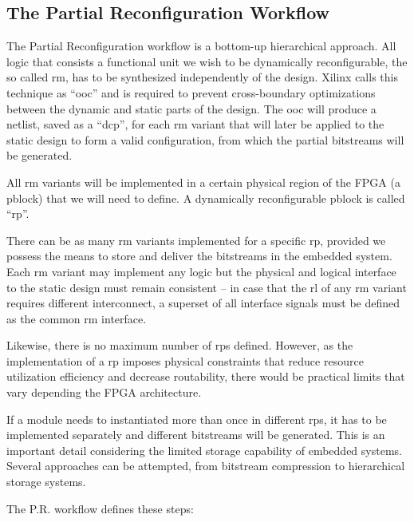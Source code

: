 \subsection{The Partial Reconfiguration Workflow}
\label{sec:pr-workflow}

The Partial Reconfiguration workflow is a bottom-up hierarchical approach.
All logic that consists a functional unit we wish to be dynamically reconfigurable,
the so called \gls{rm}, has to be synthesized independently of the design.
Xilinx calls this technique as ``\gls{ooc}'' and is required to prevent
cross-boundary optimizations between the dynamic and static parts of the design.
The \gls{ooc} will produce a netlist, saved as a ``\gls{dcp}'', for each \gls{rm} variant
that will later be applied to the static design to form a valid configuration, 
from which the partial bitstreams will be generated.

All \gls{rm} variants will be implemented in a certain physical region of the FPGA
(a \gls{pblock}) that we will need to define. A dynamically reconfigurable \gls{pblock} 
is called ``\gls{rp}''.

There can be as many \gls{rm} variants implemented for a specific \gls{rp},
provided we possess the means to store and deliver the bitstreams in the embedded system.
Each \gls{rm} variant may implement any logic but the physical and logical interface
to the static design must remain consistent -- in case that the \gls{rl} of any \gls{rm} variant
requires different interconnect, 
a superset of all interface signals must be defined as the common \gls{rm} interface.

Likewise, there is no maximum number of \glspl{rp} defined. However, as the implementation
of a \gls{rp} imposes physical constraints that reduce resource utilization efficiency and decrease
routability, there would be practical limits that vary depending the FPGA architecture.

If a module needs to instantiated more than once in different \glspl{rp}, it has to be
implemented separately and different bitstreams will be generated. 
This is an important detail considering the limited storage capability of embedded systems.
Several approaches can be attempted, from bitstream compression to hierarchical storage systems.

The P.R. workflow defines these steps:

